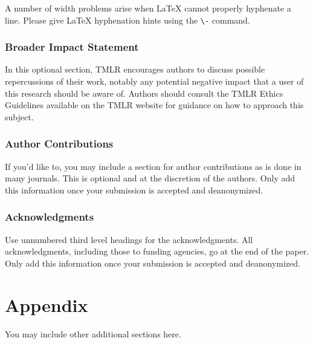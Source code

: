 \documentclass[10pt]{article} %
\begin{document}
A number of width problems arise when LaTeX cannot properly hyphenate a
line. Please give LaTeX hyphenation hints using the \verb+\-+ command.

\subsubsection*{Broader Impact Statement}
In this optional section, TMLR encourages authors to discuss possible repercussions of their work,
notably any potential negative impact that a user of this research should be aware of. 
Authors should consult the TMLR Ethics Guidelines available on the TMLR website
for guidance on how to approach this subject.

\subsubsection*{Author Contributions}
If you'd like to, you may include a section for author contributions as is done
in many journals. This is optional and at the discretion of the authors. Only add
this information once your submission is accepted and deanonymized. 

\subsubsection*{Acknowledgments}
Use unnumbered third level headings for the acknowledgments. All
acknowledgments, including those to funding agencies, go at the end of the paper.
Only add this information once your submission is accepted and deanonymized. 




\appendix
\section{Appendix}
You may include other additional sections here.
\end{document}
